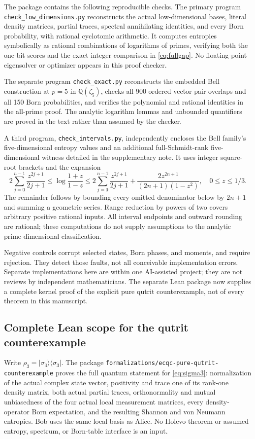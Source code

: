 \documentclass[11pt]{article}
\theoremstyle{remark}
\begin{document}
The package contains the following reproducible checks. The primary program \texttt{check\_low\_dimensions.py} reconstructs the actual low-dimensional bases, literal density matrices, partial traces, spectral annihilating identities, and every Born probability, with rational cyclotomic arithmetic. It computes entropies symbolically as rational combinations of logarithms of primes, verifying both the one-bit scores and the exact integer comparison in \eqref{eq:fullgap}. No floating-point eigensolver or optimizer appears in this proof checker.

The separate program \texttt{check\_exact.py} reconstructs the embedded Bell construction at $p=5$ in $\mathbb Q(\zeta_5)$, checks all 900 ordered vector-pair overlaps and all 150 Born probabilities, and verifies the polynomial and rational identities in the all-prime proof. The analytic logarithm lemmas and unbounded quantifiers are proved in the text rather than assumed by the checker.

A third program, \texttt{check\_intervals.py}, independently encloses the Bell family's five-dimensional entropy values and an additional full-Schmidt-rank five-dimensional witness detailed in the supplementary note. It uses integer square-root brackets and the expansion
\[
 2\sum_{j=0}^{n-1}\frac{z^{2j+1}}{2j+1}
 \leq\log\frac{1+z}{1-z}
 \leq2\sum_{j=0}^{n-1}\frac{z^{2j+1}}{2j+1}
       +\frac{2z^{2n+1}}{(2n+1)(1-z^2)},\quad 0\leq z\leq1/3.
\]
The remainder follows by bounding every omitted denominator below by $2n+1$ and summing a geometric series. Range reduction by powers of two covers arbitrary positive rational inputs. All interval endpoints and outward rounding are rational; these computations do not supply assumptions to the analytic prime-dimensional classification.

Negative controls corrupt selected states, Born phases, and moments, and require rejection. They detect those faults, not all conceivable implementation errors. Separate implementations here are within one AI-assisted project; they are not reviews by independent mathematicians. The separate Lean package now supplies a complete kernel proof of the explicit pure qutrit counterexample, not of every theorem in this manuscript.

\subsection{Complete Lean scope for the qutrit counterexample}
Write $\rho_3=|\sigma_3\rangle\langle\sigma_3|$. The package \texttt{formalizations/ecqc-pure-qutrit-counterexample} proves the full quantum statement for \eqref{eq:sigma3}: normalization of the actual complex state vector, positivity and trace one of its rank-one density matrix, both actual partial traces, orthonormality and mutual unbiasedness of the four actual local measurement matrices, every density-operator Born expectation, and the resulting Shannon and von Neumann entropies. Bob uses the same local basis as Alice. No Holevo theorem or assumed entropy, spectrum, or Born-table interface is an input.
\end{document}
